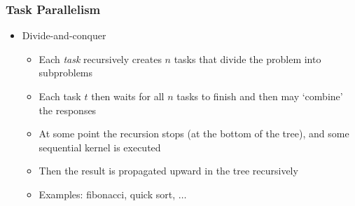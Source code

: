 \documentclass{beamer}
\begin{document}

%     

%   

%   

\begin{frame}[fragile]
  \frametitle{Task Parallelism}
  \begin{itemize}
    \item Divide-and-conquer
      \begin{itemize}
      \item Each \textit{task} recursively creates $n$ tasks that divide the
        problem into subproblems
      \item Each task $t$ then waits for all $n$ tasks to finish and then may
        `combine' the responses
      \item At some point the recursion stops (at the bottom of the tree), and
        some sequential kernel is executed
      \item Then the result is propagated upward in the tree recursively
      \item Examples: fibonacci, quick sort, $\ldots$
      \end{itemize}
  \end{itemize}
\end{frame}
\end{document}
